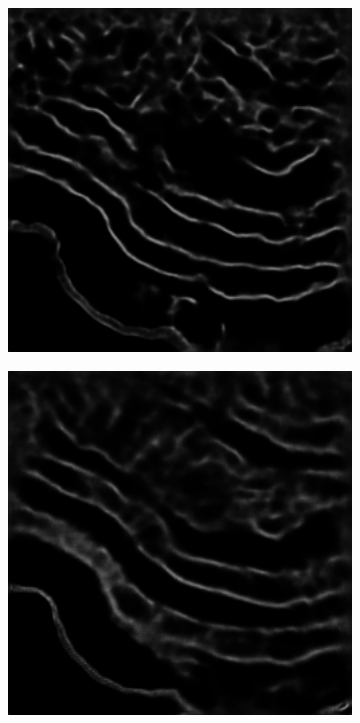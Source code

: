 \begin{figure}[!t]
\begin{subfigure}[t]{0.24\textwidth}
        \caption{}
    \end{subfigure}
    \begin{subfigure}[t]{0.24\textwidth}
        \centering
        \includegraphics[width=1\textwidth, valign=c]{images/abl-short.png}
        \caption{}
    \end{subfigure}
    \begin{subfigure}[t]{0.24\textwidth}
        \centering
        \includegraphics[width=1\textwidth, valign=c]{images/abl-half.png}

\end{subfigure}
\end{figure}
